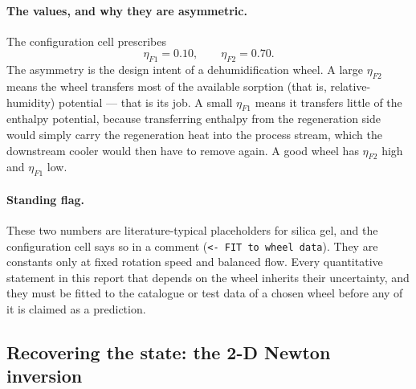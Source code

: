 \documentclass[11pt]{article}
\begin{document}
\paragraph{The values, and why they are asymmetric.}
The configuration cell prescribes
\begin{equation}
\eta_{F1}=0.10,\qquad \eta_{F2}=0.70 .
\label{eq:dw:etavals}
\end{equation}
The asymmetry is the design intent of a dehumidification wheel. A large
$\eta_{F2}$ means the wheel transfers most of the available sorption (that
is, relative-humidity) potential --- that is its job. A small $\eta_{F1}$
means it transfers little of the enthalpy potential, because transferring
enthalpy from the regeneration side would simply carry the regeneration heat
into the process stream, which the downstream cooler would then have to
remove again. A good wheel has $\eta_{F2}$ high and $\eta_{F1}$ low.

\paragraph{Standing flag.} These two numbers are literature-typical
placeholders for silica gel, and the configuration cell says so in a comment
(\texttt{<- FIT to wheel data}). They are constants only at fixed rotation
speed and balanced flow. Every quantitative statement in this report that
depends on the wheel inherits their uncertainty, and they must be fitted to
the catalogue or test data of a chosen wheel before any of it is claimed as a
prediction.

\subsection{Recovering the state: the 2-D Newton inversion}
\label{sec:dw:newton}
\end{document}
